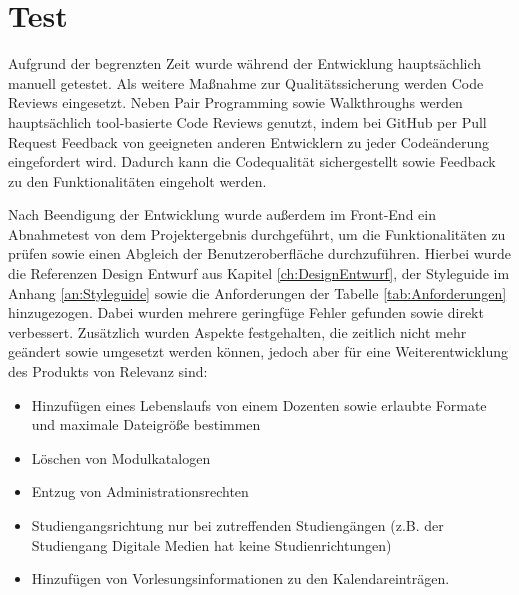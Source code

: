 \section{Test}
Aufgrund der begrenzten Zeit wurde während der Entwicklung hauptsächlich manuell getestet. 
Als weitere Maßnahme zur Qualitätssicherung werden Code Reviews eingesetzt.
Neben Pair Programming sowie Walkthroughs werden hauptsächlich tool-basierte Code Reviews genutzt, indem bei GitHub per Pull Request Feedback von geeigneten anderen Entwicklern zu jeder Codeänderung eingefordert wird.
Dadurch kann die Codequalität sichergestellt sowie Feedback zu den Funktionalitäten eingeholt werden.

Nach Beendigung der Entwicklung wurde außerdem im Front-End ein Abnahmetest von dem Projektergebnis durchgeführt, um die Funktionalitäten zu prüfen sowie einen Abgleich der Benutzeroberfläche durchzuführen. 
Hierbei wurde die Referenzen Design Entwurf aus Kapitel \vref{ch:DesignEntwurf}, der Styleguide im Anhang \vref{an:Styleguide} sowie die Anforderungen der Tabelle \vref{tab:Anforderungen} hinzugezogen.
Dabei wurden mehrere geringfüge Fehler gefunden sowie direkt verbessert. 
Zusätzlich wurden Aspekte festgehalten, die zeitlich nicht mehr geändert sowie umgesetzt werden können, jedoch aber für eine Weiterentwicklung des Produkts von Relevanz sind: 
\begin{itemize}
    \item Hinzufügen eines Lebenslaufs von einem Dozenten sowie erlaubte Formate und maximale Dateigröße bestimmen
    \item Löschen von Modulkatalogen 
    \item Entzug von Administrationsrechten
    \item Studiengangsrichtung nur bei zutreffenden Studiengängen (z.B. der Studiengang Digitale Medien hat keine Studienrichtungen)
    \item Hinzufügen von Vorlesungsinformationen zu den Kalendareinträgen.
\end{itemize}